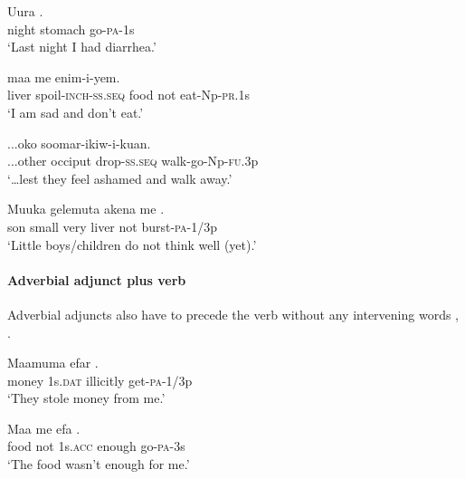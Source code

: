 \ea%
\label{ex:3:x1490}
\gll Uura  . \\
night stomach go-\textsc{pa}-1s\\
\glt`Last night I had diarrhea.'
\z

\ea%
\label{ex:3:x1487}
\gll {}  maa me enim-i-yem. \\
liver spoil-\textsc{inch}-\textsc{ss}.\textsc{seq} food not eat-Np-\textsc{pr}.1s\\
\glt`I am sad and don't eat.'
\z

\ea%
\label{ex:3:x1488}
\gll ...oko   \textstyleEmphasizedVernacularWords{-} soomar-ikiw-i-kuan. \\
...other occiput drop-\textsc{ss}.\textsc{seq} walk-go-Np-\textsc{fu}.3p\\
\glt`{\dots}lest they feel ashamed and walk away.'
\z

\ea%
\label{ex:3:x1489}
\gll Muuka gelemuta akena  me \textstyleEmphasizedVernacularWords{-}\textstyleEmphasizedVernacularWords{-}. \\
son small very liver not burst-\textsc{pa}-1/3p\\
\glt`Little boys/children do not think well (yet).'
\z

\paragraph{Adverbial adjunct plus verb}
{}
Adverbial adjuncts also have to precede the verb without any intervening words , .

\ea%
\label{ex:3:x456}
\gll Maamuma efar  . \\
money 1s.\textsc{dat} illicitly get-\textsc{pa}-1/3p\\
\glt`They stole money from me.'
\z

\ea%
\label{ex:3:x457}
\gll Maa me efa  . \\
food not 1s.\textsc{acc} enough go-\textsc{pa}-3s\\
\glt`The food wasn't enough for me.'
\z

